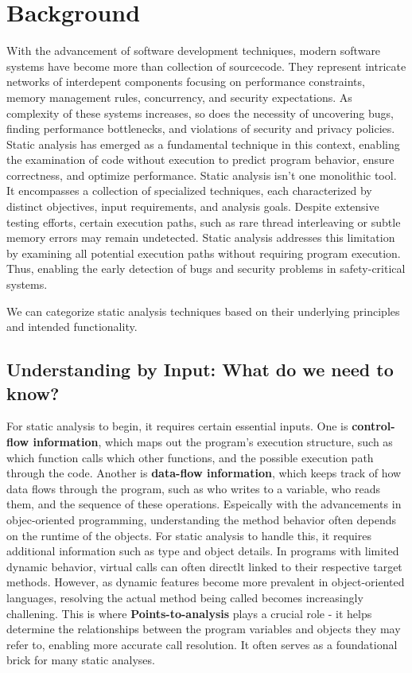 \section{Background}
With the advancement of software development techniques, modern software systems have become more than collection of sourcecode. They represent intricate networks of interdepent components focusing on performance constraints, 
memory management rules, concurrency, and security expectations. As complexity of these systems increases, so does the necessity of uncovering bugs, finding performance bottlenecks, and violations of security and privacy policies.
Static analysis has emerged  as a fundamental technique in this context, enabling the examination of code without execution to predict program behavior, ensure correctness, and optimize performance.
Static analysis isn't one monolithic tool. It encompasses a collection of specialized techniques, each characterized by distinct objectives, input requirements, and analysis goals.
Despite extensive testing efforts, certain execution paths, such as rare thread interleaving or subtle memory errors may remain undetected. Static analysis addresses this limitation by examining all potential execution paths without requiring program execution.
Thus, enabling the early detection of bugs and security problems in safety-critical systems. 

We can categorize static analysis techniques based on their underlying principles and intended functionality.

\subsection{Understanding by Input: What do we need to know?}
For static analysis to begin, it requires certain essential inputs. One is \textbf{control-flow information}, which maps out the program's execution structure, such as which function calls which other functions, and the possible execution path through the code.
Another is \textbf{data-flow information}, which keeps track of how data flows through the program, such as who writes to a variable, who reads them, and the sequence of these operations.
Espeically with the advancements in objec-oriented programming, understanding the method behavior often depends on the runtime of the objects. For static analysis to handle this, it requires additional information such as type and object details.
In programs with limited dynamic behavior, virtual calls can often directlt linked to their respective target methods. However, as dynamic features become more prevalent in object-oriented languages, resolving the actual method being called becomes increasingly challening. 
This is where \textbf{Points-to-analysis} \cite{lhotak2003scaling} plays a crucial role - it helps determine the relationships between the program variables and objects they may refer to, enabling more accurate call resolution.
It often serves as a foundational brick for many static analyses.


